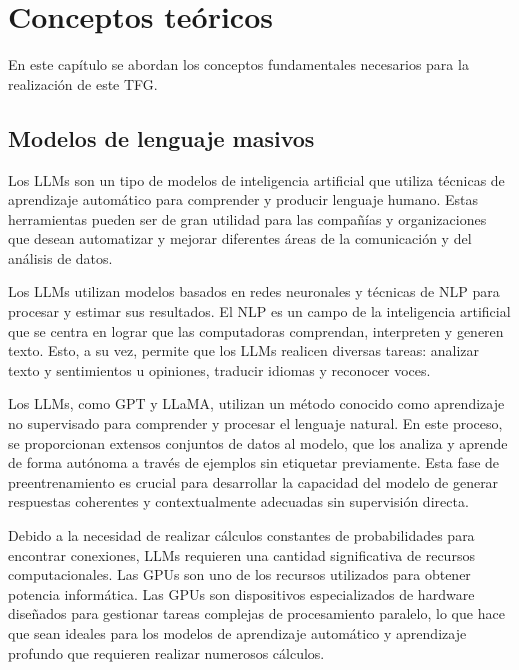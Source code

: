 \chapter{Conceptos teóricos}
\label{chap:conceptos}


\lettrine{E}{}n este capítulo se abordan los conceptos fundamentales necesarios para la realización de este \acrfull{TFG}.

\section{Modelos de lenguaje masivos}

Los \acrfull{LLMs} son un tipo de modelos de inteligencia artificial que utiliza técnicas de aprendizaje automático para comprender y producir lenguaje humano. Estas herramientas pueden ser de gran utilidad para las compañías y organizaciones que desean automatizar y mejorar diferentes áreas de la comunicación y del análisis de datos.

Los \acrshort{LLMs} utilizan modelos basados en redes neuronales y técnicas de \acrfull{NLP} para procesar y estimar sus resultados. El \acrshort{NLP} es un campo de la inteligencia artificial que se centra en lograr que las computadoras comprendan, interpreten y generen texto. Esto, a su vez, permite que los \acrshort{LLMs} realicen diversas tareas: analizar texto y sentimientos u opiniones, traducir idiomas y reconocer voces.

Los \acrshort{LLMs}, como \acrfull{GPT} y \acrfull{LLaMA}, utilizan un método conocido como aprendizaje no supervisado para comprender y procesar el lenguaje natural. En este proceso, se proporcionan extensos conjuntos de datos al modelo, que los analiza y aprende de forma autónoma a través de ejemplos sin etiquetar previamente. Esta fase de preentrenamiento es crucial para desarrollar la capacidad del modelo de generar respuestas coherentes y contextualmente adecuadas sin supervisión directa.

Debido a la necesidad de realizar cálculos constantes de probabilidades para encontrar conexiones, \acrshort{LLMs} requieren una cantidad significativa de recursos computacionales. Las \acrfull{GPU}s son uno de los recursos utilizados para obtener potencia informática. Las \acrshort{GPU}s son dispositivos  especializados de hardware diseñados para gestionar tareas complejas de procesamiento paralelo, lo que hace que sean ideales para los modelos de aprendizaje automático y aprendizaje profundo que requieren realizar numerosos cálculos.

